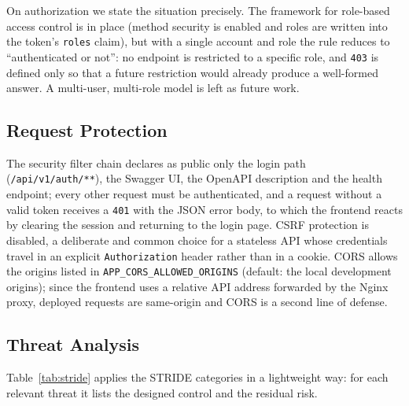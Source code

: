 On authorization we state the situation precisely. The framework for role-based access control is in place (method security is enabled and roles are written into the token's \texttt{roles} claim), but with a single account and role the rule reduces to ``authenticated or not'': no endpoint is restricted to a specific role, and \texttt{403} is defined only so that a future restriction would already produce a well-formed answer. A multi-user, multi-role model is left as future work.

\subsection{Request Protection}

The security filter chain declares as public only the login path (\texttt{/api/v1/auth/**}), the Swagger UI, the OpenAPI description and the health endpoint; every other request must be authenticated, and a request without a valid token receives a \texttt{401} with the JSON error body, to which the frontend reacts by clearing the session and returning to the login page. CSRF protection is disabled, a deliberate and common choice for a stateless API whose credentials travel in an explicit \texttt{Authorization} header rather than in a cookie. CORS allows the origins listed in \texttt{APP\_CORS\_ALLOWED\_ORIGINS} (default: the local development origins); since the frontend uses a relative API address forwarded by the Nginx proxy, deployed requests are same-origin and CORS is a second line of defense.

\subsection{Threat Analysis}

Table~\ref{tab:stride} applies the STRIDE categories in a lightweight way: for each relevant threat it lists the designed control and the residual risk.

